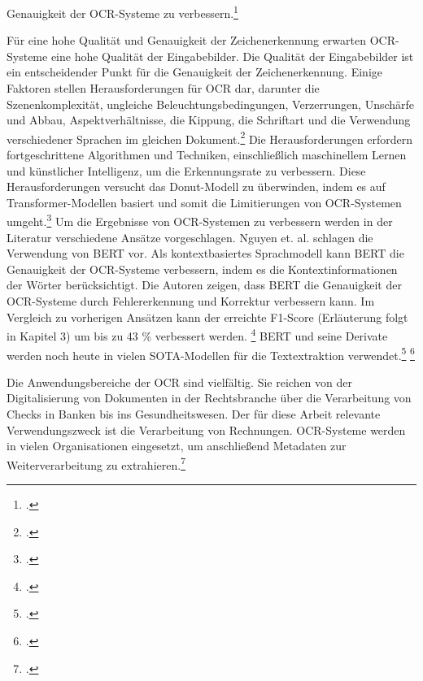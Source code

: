 Genauigkeit der OCR-Systeme zu verbessern.\footcites[Vgl.][S. 335 f.]{nguyen_neural_2020}

Für eine hohe Qualität und Genauigkeit der Zeichenerkennung erwarten OCR-Systeme eine hohe Qualität der Eingabebilder. Die Qualität der Eingabebilder ist ein entscheidender Punkt für die Genauigkeit der Zeichenerkennung. Einige Faktoren stellen Herausforderungen für OCR dar, darunter die Szenenkomplexität, ungleiche Beleuchtungsbedingungen, Verzerrungen, Unschärfe und Abbau, Aspektverhältnisse, die Kippung, die Schriftart und die Verwendung verschiedener Sprachen im gleichen Dokument.\footcites[Vgl.][S. 245]{hamad_detailed_2016} Die Herausforderungen erfordern fortgeschrittene Algorithmen und Techniken, einschließlich maschinellem Lernen und künstlicher Intelligenz, um die Erkennungsrate zu verbessern. Diese Herausforderungen versucht das Donut-Modell zu überwinden, indem es auf Transformer-Modellen basiert und somit die Limitierungen von OCR-Systemen umgeht.\footcites[Vgl.][S. 1]{kim_ocr-free_2021} Um die Ergebnisse von OCR-Systemen zu verbessern werden in der Literatur verschiedene Ansätze vorgeschlagen. Nguyen et. al. schlagen die Verwendung von BERT vor. Als kontextbasiertes Sprachmodell kann BERT die Genauigkeit der OCR-Systeme verbessern, indem es die Kontextinformationen der Wörter berücksichtigt. Die Autoren zeigen, dass BERT die Genauigkeit der OCR-Systeme durch Fehlererkennung und Korrektur verbessern kann. Im Vergleich zu vorherigen Ansätzen kann der erreichte F1-Score (Erläuterung folgt in Kapitel 3) um bis zu 43 \% verbessert werden. \footcites[Vgl.][S. 335 f.]{nguyen_neural_2020} BERT und seine Derivate werden noch heute in vielen \ac{SOTA}-Modellen für die Textextraktion verwendet.\footcites[Vgl. dazu ausführlich][S. 4084 ff.]{huang_layoutlmv3_2022} \footcites[Vgl. dazu ausführlich][S. 2 ff.]{garncarek_lambert_2020}

Die Anwendungsbereiche der OCR sind vielfältig. Sie reichen von der Digitalisierung von Dokumenten in der Rechtsbranche über die Verarbeitung von Checks in Banken bis ins Gesundheitswesen. Der für diese Arbeit relevante Verwendungszweck ist die Verarbeitung von Rechnungen. OCR-Systeme werden in vielen Organisationen eingesetzt, um anschließend Metadaten zur Weiterverarbeitung zu extrahieren.\footcites[Vgl.][S. 247 f.]{hamad_detailed_2016}

